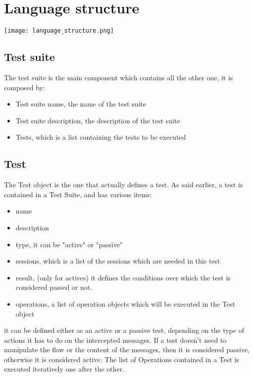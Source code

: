 \section{Language structure}
\texttt{[image: language\_structure.png]}

\subsection{Test suite}
The test suite is the main component which contains all the other one, it is composed by:
\begin{itemize}
    \item Test suite name, the name of the test suite
    \item Test suite description, the description of the test suite
    \item Tests, which is a list containing the tests to be executed
\end{itemize}

\subsection{Test}
The Test object is the one that actually defines a test. As said earlier, a test is contained in a Test Suite, and has various items:
\begin{itemize}
    \item name
    \item description
    \item type, it can be "active" or "passive"
    \item sessions, which is a list of the sessions which are needed in this test
    \item result, (only for actives) it defines the conditions over which the test is considered passed or not.
    \item operations, a list of operation objects which will be executed in the Test object
\end{itemize}

it can be defined either as an active or a passive test, depending on the type of actions it has to do on the intercepted messages. If a test doesn't need to manipulate the flow or the content of the messages, then it is considered passive, otherwise it is considered active.
The list of Operations contained in a Test is executed iteratively one after the other.

